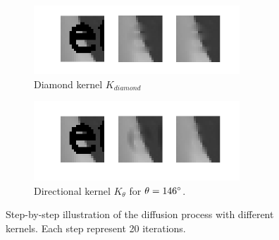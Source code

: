 \begin{figure}
	\centering
	\begin{subfigure}[b]{0.4\textwidth}
		\centering
		\includegraphics[clip, trim=0cm 1cm 0cm 0.5cm, width=0.85\textwidth]{figures/step-by-step-cross}
		\caption{Diamond kernel $K_{diamond}$}
		\label{fig:stepbystepcross}
	\end{subfigure}
	\begin{subfigure}[b]{0.4\textwidth}
		\centering
		\includegraphics[clip, trim=0cm 1cm 0cm 0.5cm, width=0.85\textwidth]{figures/step-by-step-directional}
		\caption{Directional kernel $K_\theta$ for $\theta = 146\degree$.}
		\label{fig:stepbystepdir}
	\end{subfigure}
	\caption{Step-by-step illustration of the diffusion process with different kernels. Each step represent 20 iterations.}
\end{figure}